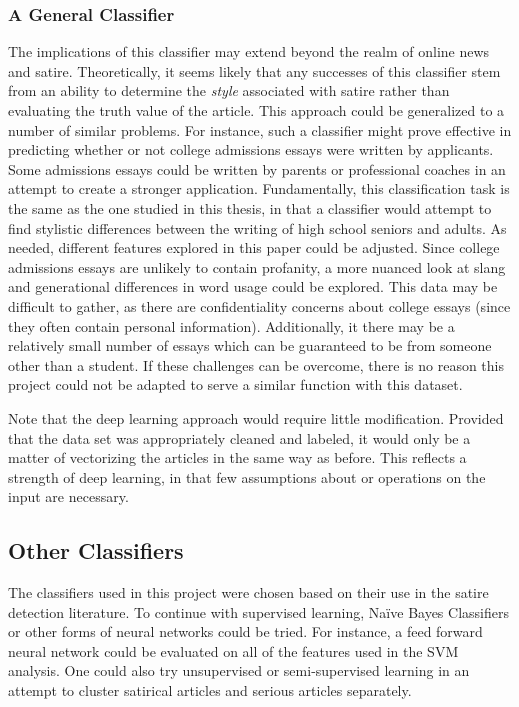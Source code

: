\documentclass [12 pt] {report}
\begin{document}
\subsubsection*{A General Classifier}
The implications of this classifier may extend beyond the realm of online news and satire. Theoretically, it seems likely that any successes of this classifier stem from an ability to determine the \textit{style} associated with satire rather than evaluating the truth value of the article. This approach could be generalized to a number of similar problems. For instance, such a classifier might prove effective in predicting whether or not college admissions essays were written by applicants. Some admissions essays could be written by parents or professional coaches in an attempt to create a stronger application. Fundamentally, this classification task is the same as the one studied in this thesis, in that a classifier would attempt to find stylistic differences between the writing of high school seniors and adults. As needed, different features explored in this paper could be adjusted. Since college admissions essays are unlikely to contain profanity, a more nuanced look at slang and generational differences in word usage could be explored. This data may be difficult to gather, as there are confidentiality concerns about college essays (since they often contain personal information). Additionally, it there may be a relatively small number of essays which can be guaranteed to be from someone other than a student. If these challenges can be overcome, there is no reason this project could not be adapted to serve a similar function with this dataset.

Note that the deep learning approach would require little modification. Provided that the data set was appropriately cleaned and labeled, it would only be a matter of vectorizing the articles in the same way as before. This reflects a strength of deep learning, in that few assumptions about or operations on the input are necessary. 

\subsection{Other Classifiers}
The classifiers used in this project were chosen based on their use in the satire detection literature. To continue with supervised learning, Na{\"i}ve Bayes Classifiers or other forms of neural networks could be tried. For instance, a feed forward neural network could be evaluated on all of the features used in the SVM analysis. One could also try unsupervised or semi-supervised learning in an attempt to cluster satirical articles and serious articles separately.
\end{document}

